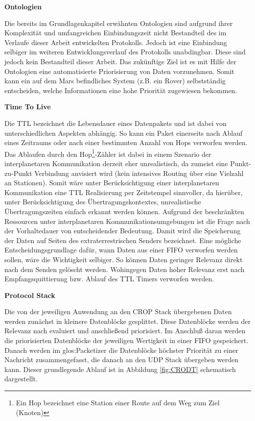 \label{sec:Vorueberlegung}

\textbf{Ontologien}

Die bereits im Grundlagenkapitel erw{\"a}hnten Ontologien sind aufgrund ihrer
Komplexit{\"a}t und umfangreichen Einbindungszeit nicht Bestandteil des im
Verlaufe dieser Arbeit entwickelten Protokolls. Jedoch ist eine Einbindung
selbiger im weiteren Entwicklungsverlauf des Protokolls unabdingbar. Diese sind
jedoch kein Bestandteil dieser Arbeit.
Das zuk{\"u}nftige Ziel ist es mit Hilfe der Ontologien eine automatisierte
Priorisierung von Daten vorzunehmen. Somit kann ein auf dem Mars
befindliches System (z.B. ein Rover) selbstst{\"a}ndig entscheiden, welche
Informationen eine hohe Priorit{\"a}t zugewiesen bekommen.

\textbf{Time To Live}

Die \gls{TTL} bezeichnet die Lebensdauer eines Datenpakets und ist
dabei von unterschiedlichen Aspekten abh{\"a}ngig. So kann ein Paket einerseits nach
Ablauf eines Zeitraums oder nach einer bestimmten Anzahl
von Hops verworfen werden. Das Ablaufen durch den Hop\footnote{Ein Hop
bezeichnet eine Station einer Route auf dem Weg zum Ziel (Knoten)}-Zähler
ist dabei in einem Szenario der interplanetaren Kommunikation derzeit eher
unrealistisch, da zumeist eine Punkt-zu-Punkt Verbindung anvisiert wird (kein
intensives Routing {\"u}ber eine Vielzahl an Stationen). Somit w{\"a}re unter
Ber{\"u}cksichtigung einer interplanetaren Kommunikation eine \gls{TTL} Realisierung
per Zeitstempel sinnvoller, da hier{\"u}ber, unter Ber{\"u}cksichtigung des
{\"U}bertragungskontextes, unrealistische {\"U}bertragungszeiten einfach erkannt
werden k{\"o}nnen.
Aufgrund der beschr{\"a}nkten Ressourcen unter interplanetaren
Kommunikationsumgebungen ist die Frage nach der Vorhaltedauer von
entscheidender Bedeutung. Damit wird die Speicherung der
Daten auf Seiten des extraterrestrischen Senders bezeichnet. 
Eine m{\"o}gliche Entscheidungsgrundlage daf{\"u}r, wann Daten aus einer
\gls{FIFO} verworfen werden sollen, w{\"a}re die Wichtigkeit selbiger. So
k{\"o}nnen Daten geringer Relevanz direkt nach dem Senden gel{\"o}scht werden.
Wohingegen Daten hoher Relevanz erst nach Empfangsquittierung bzw. Ablauf des
\gls{TTL} Timers verworfen werden.

\textbf{Protocol Stack} \label{sec:Konzept_Protocolstack}

Die von der jeweiligen Anwendung an den \gls{CROP} Stack {\"u}bergebenen Daten
werden zun{\"a}chst in kleinere Datenbl{\"o}cke gesplittet. Diese Datenbl{\"o}cke
werden der Relevanz nach evaluiert und anschlie{\ss}end priorisiert.
Im Anschlu{\ss} daran werden die priorisierten Datenbl{\"o}cke der jeweiligen
Wertigkeit in einer \gls{FIFO} gespeichert. Danach werden im
\gls{glos:Packetizer} die Datenbl{\"o}cke h{\"o}chster Priorit{\"a}t zu einer
Nachricht zusammengefasst, die danach an den \gls{UDP} Stack {\"u}bergeben werden
kann. Dieser grundlegende Ablauf ist in Abbildung \ref{fig:CRODT} schematisch
dargestellt.

